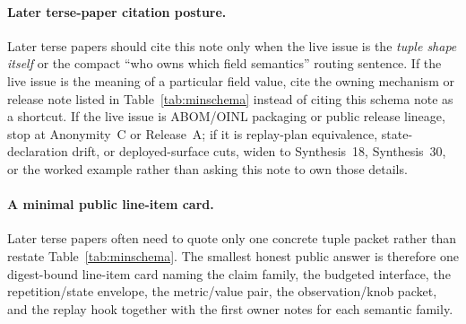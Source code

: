 \documentclass[11pt]{article}
\begin{document}
\paragraph{Later terse-paper citation posture.}
Later terse papers should cite this note only when the live issue is the \emph{tuple shape itself} or the compact ``who owns which field semantics'' routing sentence.
If the live issue is the meaning of a particular field value, cite the owning mechanism or release note listed in Table~\ref{tab:minschema} instead of citing this schema note as a shortcut.
If the live issue is ABOM/OINL packaging or public release lineage, stop at Anonymity~C or Release~A; if it is replay-plan equivalence, state-declaration drift, or deployed-surface cuts, widen to Synthesis~18, Synthesis~30, or the worked example rather than asking this note to own those details.\cite{series:abomoinl,series:releaseproperty,series:planstateequiv,series:deployedsurfaces,series:workedexample}

\paragraph{A minimal public line-item card.}
Later terse papers often need to quote only one concrete tuple packet rather than restate Table~\ref{tab:minschema}. The smallest honest public answer is therefore one digest-bound line-item card naming the claim family, the budgeted interface, the repetition/state envelope, the metric/value pair, the observation/knob packet, and the replay hook together with the first owner notes for each semantic family.
\end{document}
